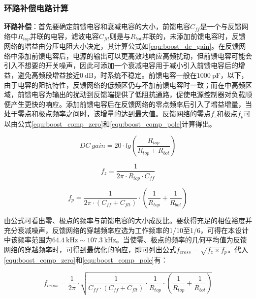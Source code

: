 \subsubsection{环路补偿电路计算}
\textbf{环路补偿}：首先要确定前馈电容和衰减电容的大小，前馈电容$C_{ff}$是一个与反馈网络中$R_{top}$并联的电容，滤波电容$C_{flt}$则是与$R_{bot}$并联的，未添加前馈电容时，反馈网络的增益由分压电阻大小决定，其计算公式如\eqref{equ:boost_dc_gain}。在反馈网络中添加前馈电容后，电源的输出可以更高效地响应高频扰动，但前馈电容可能会引入不想要的开关噪声，因此可添加一个衰减电容用于减小引入前馈电容后的增益，避免高频段增益接近$\qty{0}{\dB}$，时系统不稳定。前馈电容一般在$\qty{1000}{\pF}$，以下，由于电容的阻抗特性，反馈网络的低频区仍与不加前馈电容时一致；而在中高频区域，前馈电容为输出的扰动到反馈端提供了低阻抗通路，促使电源控制器对负载顺便产生更快的响应。添加前馈电容后在反馈网络的零点频率后引入了增益增量，当处于零点和极点频率之间时，该增量的达到最大值。反馈网络的零点$f_z$和极点$f_p$可以由公式\eqref{equ:boost_comp_zero}和\eqref{equ:boost_comp_pole}计算得出。

\begin{equation}
    DC\ gain=20 \cdot lg(\frac{R_{top}}{R_{top}+R_{bot}})
    \label{equ:boost_dc_gain}
\end{equation}

\begin{equation}
    f_z=\frac{1}{2\pi \cdot R_{top} \cdot C_{ff}}
    \label{equ:boost_comp_zero}
\end{equation}

\begin{equation}
    f_p=\frac{1}{2\pi \cdot (C_{ff}+C_{flt})} \cdot (\frac{1}{R_{top}} +\frac{1}{R_{bot}})
    \label{equ:boost_comp_pole}
\end{equation}

\par
由公式可看出零、极点的频率与前馈电容的大小成反比。要获得充足的相位裕度并充分衰减噪声，反馈网络的穿越频率应选为工作频率的1/10至1/6，可得在本设计中该频率范围为$\qty{64.4}{\kHz}\sim\qty{107.3}{\kHz}$。当使零、极点的频率的几何平均值为反馈网络的穿越频率时，可得到最优化的响应，即可列出公式$f_{cross}=\sqrt{f_z \times f_p}$。代入\eqref{equ:boost_comp_zero}和\eqref{equ:boost_comp_pole}有：

\[
f_{cross}=\frac{1}{2\pi} \cdot \sqrt{\frac{1}{C_{ff} \cdot (C_{ff}+C_{flt})} \cdot \frac{1}{R_{top}} \cdot (\frac{1}{R_{top}} +\frac{1}{R_{bot}})}
\]


